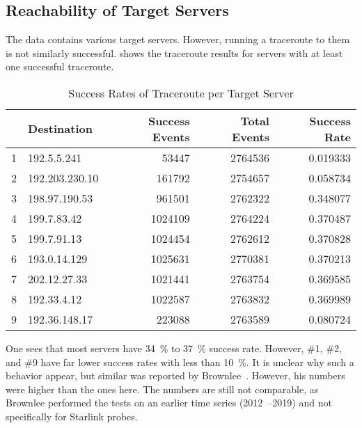 
\subsection{Reachability of Target Servers}

The data contains various target servers. However, running a traceroute to them
is not similarly successful.  shows the
traceroute results for servers with at least one successful traceroute.

\begin{table}
	\footnotesize
	\caption{Success Rates of Traceroute per Target Server}
	\label{fig:traceroute-success-rates}
	\begin{tabular}{llrrr}
		\toprule
		  & Destination    & Success Events & Total Events & Success Rate \\
		\midrule
		1 & 192.5.5.241    & 53447          & 2764536      & 0.019333     \\
		2 & 192.203.230.10 & 161792         & 2754657      & 0.058734     \\
		3 & 198.97.190.53  & 961501         & 2762322      & 0.348077     \\
		4 & 199.7.83.42    & 1024109        & 2764224      & 0.370487     \\
		5 & 199.7.91.13    & 1024454        & 2762612      & 0.370828     \\
		6 & 193.0.14.129   & 1025631        & 2770381      & 0.370213     \\
		7 & 202.12.27.33   & 1021441        & 2763754      & 0.369585     \\
		8 & 192.33.4.12    & 1022587        & 2763832      & 0.369989     \\
		9 & 192.36.148.17  & 223088         & 2763589      & 0.080724     \\
		\bottomrule
	\end{tabular}
\end{table}

One sees that most servers have 34~\% to 37~\% success rate. However, \#1, \#2,
and \#9 have far lower success rates with less than 10~\%. It is unclear why
such a behavior appear, but similar was reported by
Brownlee~\cite{Brownlee2021}. However, his numbers were higher than the ones
here. The numbers are still not comparable, as Brownlee performed the tests on
an earlier time series (2012~--2019) and not specifically for Starlink probes.

